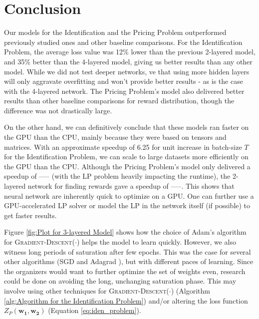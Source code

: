 \documentclass[12pt]{article}
\newcommand{\matr}[1]{\mathbf{#1}}  %
\begin{document}
    \section{Conclusion} \label{sec:Conclusion}
    Our models for the Identification and the Pricing Problem outperformed previously studied ones and other baseline comparisons. For the Identification Problem, the average loss value was 12\% lower than the previous 2-layered model, and 35\% better than the 4-layered model, giving us better results than any other model. While we did not test deeper networks, ve that using more hidden layers will only aggravate overfitting and won't provide better results - as is the case with the 4-layered network. The Pricing Problem's model also delivered better results than other baseline comparisons for reward distribution, though the difference was not drastically large.
    
    On the other hand, we can definitively conclude that these models ran faster on the GPU than the CPU, mainly because they were based on tensors and matrices. With an approximate speedup of 6.25 for unit increase in batch-size $T$ for the Identification Problem, we can scale to large datasets more efficiently on the GPU than the CPU. Although the Pricing Problem's model only delivered a speedup of ----- (with the LP problem heavily impacting the runtime), the 2-layered network for finding rewards gave a speedup of -----. This shows that neural network are inherently quick to optimize on a GPU. One can further use a GPU-accelerated LP solver or model the LP in the network itself (if possible) to get faster results.
    
    Figure \ref{fig:Plot for 3-layered Model} shows how the choice of Adam's algorithm \cite{Adam} for \textsc{Gradient-Descent}($\cdot$) helps the model to learn quickly. However, we also witness long periods of saturation after few epochs. This was the case for several other algorithms (SGD \cite{SGD} and Adagrad \cite{Adagrad}), but with different paces of learning. Since the organizers would want to further optimize the set of weights even, research could be done on avoiding the long, unchanging saturation phase. This may involve using other techniques for \textsc{Gradient-Descent}($\cdot$) (Algorithm \ref{alg:Algorithm for the Identification Problem}) and/or altering the loss function $Z_P(\matr{w_1}, \matr{w_2})$ (Equation \ref{eq:iden_problem}).
    
\end{document}
